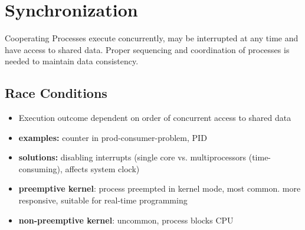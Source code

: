 \section*{Synchronization}
Cooperating Processes execute concurrently, may be interrupted at any time and have access to shared data. Proper sequencing and coordination of processes is needed to maintain data consistency.
\subsection*{Race Conditions}
\begin{itemize}
    \item Execution outcome dependent on order of concurrent access to shared data
        \item \textbf{examples:} counter in prod-consumer-problem, PID
        \item \textbf{solutions:} disabling interrupts (single core vs. multiprocessors (time-consuming), affects system clock)
        \item \textbf{preemptive kernel}: process preempted in kernel mode, most common. more responsive, suitable for real-time programming
    \item \textbf{non-preemptive kernel}: uncommon, process blocks CPU
\end{itemize}
